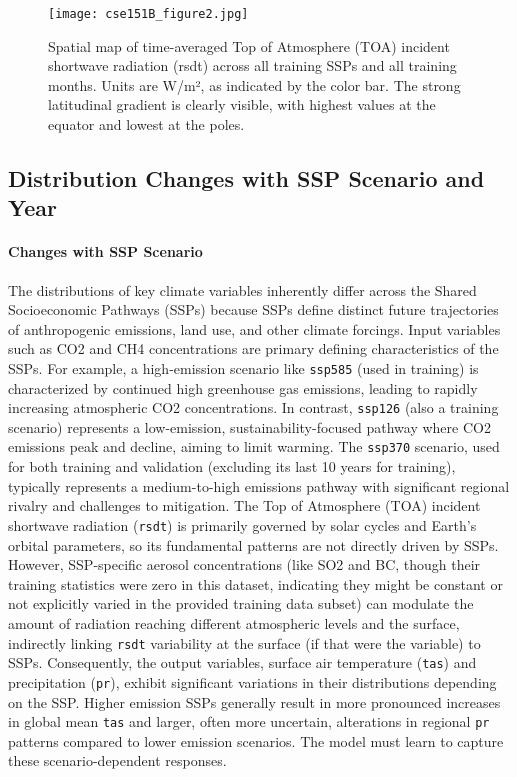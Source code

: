 \documentclass{article}
\begin{document}
\begin{figure}[h!]
  \centering
  \texttt{[image: cse151B\_figure2.jpg]} %
  \caption{Spatial map of time-averaged Top of Atmosphere (TOA) incident shortwave radiation ({rsdt}) across all training SSPs and all training months. Units are W/m², as indicated by the color bar. The strong latitudinal gradient is clearly visible, with highest values at the equator and lowest at the poles.}
  \label{fig:rsdt_visualization}
\end{figure}

\subsection{Distribution Changes with SSP Scenario and Year}

\paragraph{Changes with SSP Scenario}
The distributions of key climate variables inherently differ across the Shared Socioeconomic Pathways (SSPs) because SSPs define distinct future trajectories of anthropogenic emissions, land use, and other climate forcings.
Input variables such as CO2 and CH4 concentrations are primary defining characteristics of the SSPs. For example, a high-emission scenario like \texttt{ssp585} (used in training) is characterized by continued high greenhouse gas emissions, leading to rapidly increasing atmospheric CO2 concentrations. In contrast, \texttt{ssp126} (also a training scenario) represents a low-emission, sustainability-focused pathway where CO2 emissions peak and decline, aiming to limit warming. The \texttt{ssp370} scenario, used for both training and validation (excluding its last 10 years for training), typically represents a medium-to-high emissions pathway with significant regional rivalry and challenges to mitigation.
The Top of Atmosphere (TOA) incident shortwave radiation (\texttt{rsdt}) is primarily governed by solar cycles and Earth's orbital parameters, so its fundamental patterns are not directly driven by SSPs. However, SSP-specific aerosol concentrations (like SO2 and BC, though their training statistics were zero in this dataset, indicating they might be constant or not explicitly varied in the provided training data subset) can modulate the amount of radiation reaching different atmospheric levels and the surface, indirectly linking \texttt{rsdt} variability at the surface (if that were the variable) to SSPs.
Consequently, the output variables, surface air temperature (\texttt{tas}) and precipitation (\texttt{pr}), exhibit significant variations in their distributions depending on the SSP. Higher emission SSPs generally result in more pronounced increases in global mean \texttt{tas} and larger, often more uncertain, alterations in regional \texttt{pr} patterns compared to lower emission scenarios. The model must learn to capture these scenario-dependent responses.
\end{document}
